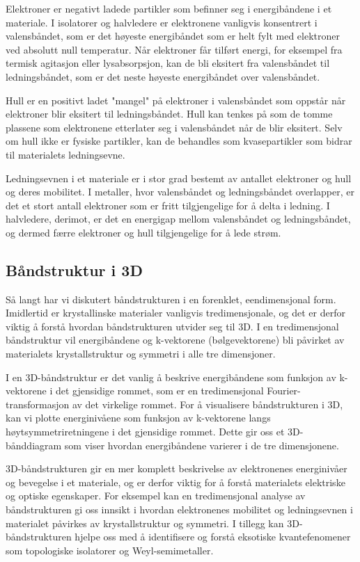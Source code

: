 Elektroner er negativt ladede partikler som befinner seg i energibåndene i et materiale. I isolatorer og halvledere er elektronene vanligvis konsentrert i valensbåndet, som er det høyeste energibåndet som er helt fylt med elektroner ved absolutt null temperatur. Når elektroner får tilført energi, for eksempel fra termisk agitasjon eller lysabsorpsjon, kan de bli eksitert fra valensbåndet til ledningsbåndet, som er det neste høyeste energibåndet over valensbåndet.

Hull er en positivt ladet "mangel" på elektroner i valensbåndet som oppstår når elektroner blir eksitert til ledningsbåndet. Hull kan tenkes på som de tomme plassene som elektronene etterlater seg i valensbåndet når de blir eksitert. Selv om hull ikke er fysiske partikler, kan de behandles som kvasepartikler som bidrar til materialets ledningsevne.

Ledningsevnen i et materiale er i stor grad bestemt av antallet elektroner og hull og deres mobilitet. I metaller, hvor valensbåndet og ledningsbåndet overlapper, er det et stort antall elektroner som er fritt tilgjengelige for å delta i ledning. I halvledere, derimot, er det en energigap mellom valensbåndet og ledningsbåndet, og dermed færre elektroner og hull tilgjengelige for å lede strøm.

\subsection*{Båndstruktur i 3D}
Så langt har vi diskutert båndstrukturen i en forenklet, eendimensjonal form. Imidlertid er krystallinske materialer vanligvis tredimensjonale, og det er derfor viktig å forstå hvordan båndstrukturen utvider seg til 3D. I en tredimensjonal båndstruktur vil energibåndene og k-vektorene (bølgevektorene) bli påvirket av materialets krystallstruktur og symmetri i alle tre dimensjoner.

I en 3D-båndstruktur er det vanlig å beskrive energibåndene som funksjon av k-vektorene i det gjensidige rommet, som er en tredimensjonal Fourier-transformasjon av det virkelige rommet. For å visualisere båndstrukturen i 3D, kan vi plotte energinivåene som funksjon av k-vektorene langs høytsymmetriretningene i det gjensidige rommet. Dette gir oss et 3D-bånddiagram som viser hvordan energibåndene varierer i de tre dimensjonene.

3D-båndstrukturen gir en mer komplett beskrivelse av elektronenes energinivåer og bevegelse i et materiale, og er derfor viktig for å forstå materialets elektriske og optiske egenskaper. For eksempel kan en tredimensjonal analyse av båndstrukturen gi oss innsikt i hvordan elektronenes mobilitet og ledningsevnen i materialet påvirkes av krystallstruktur og symmetri. I tillegg kan 3D-båndstrukturen hjelpe oss med å identifisere og forstå eksotiske kvantefenomener som topologiske isolatorer og Weyl-semimetaller.

